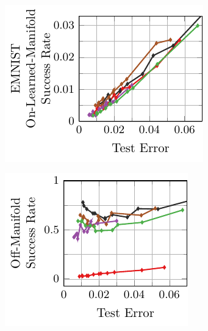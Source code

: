 \begin{appendix}
\begin{figure}[t]
\begin{subfigure}{0.235\textwidth}
    \end{subfigure}
    \\
    \begin{subfigure}{0.255\textwidth}
        \centering
        \includegraphics[width=\textwidth]{appendix_l2_emnist_error_on_learned_madry.pdf}
    \end{subfigure}
    \begin{subfigure}{0.235\textwidth}
        \centering
        \includegraphics[width=\textwidth]{appendix_l2_emnist_error_off_madry.pdf}
    \end{subfigure}

\end{figure}
\end{appendix}
